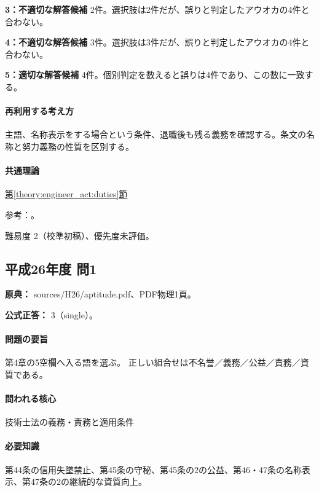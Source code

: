 \noindent\textbf{3：不適切な解答候補} 2件。選択肢は2件だが、誤りと判定したアウオカの4件と合わない。\par

\noindent\textbf{4：不適切な解答候補} 3件。選択肢は3件だが、誤りと判定したアウオカの4件と合わない。\par

\noindent\textbf{5：適切な解答候補} 4件。個別判定を数えると誤りは4件であり、この数に一致する。\par

\paragraph{再利用する考え方} 主語、名称表示をする場合という条件、退職後も残る義務を確認する。条文の名称と努力義務の性質を区別する。

\paragraph{共通理論} \hyperref[theory:engineer_act:duties]{第\ref*{theory:engineer_act:duties}節}

\par 参考：\cite{engineer_act_current}。

\par 難易度 2（校準初稿）、優先度未評価。

\subsection{平成26年度 問1}
\label{q:h26-reg-apt-01}

\noindent\textbf{原典：} sources/H26/aptitude.pdf、PDF物理1頁。

\textbf{公式正答：} 3（single）。

\paragraph{問題の要旨} 第4章の5空欄へ入る語を選ぶ。 正しい組合せは不名誉／義務／公益／責務／資質である。

\paragraph{問われる核心} 技術士法の義務・責務と適用条件

\paragraph{必要知識} 第44条の信用失墜禁止、第45条の守秘、第45条の2の公益、第46・47条の名称表示、第47条の2の継続的な資質向上。

